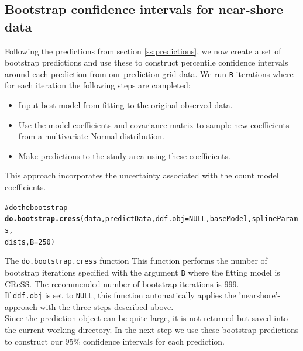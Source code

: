 \documentclass[11pt, a4paper]{article}
\makeatletter
\newcommand{\hlfunctioncall}[1]{\textcolor[rgb]{0.501960784313725,0,0.329411764705882}{\textbf{#1}}}%
\newcommand{\hlcomment}[1]{\textcolor[rgb]{0.180392156862745,0.6,0.341176470588235}{#1}}%
\newenvironment{kframe}{%
 \def\at@end@of@kframe{}%
 \ifinner\ifhmode%
  \def\at@end@of@kframe{\end{minipage}}%
  \begin{minipage}{\columnwidth}%
 \fi\fi%
 \def\FrameCommand##1{\hskip\@totalleftmargin \hskip-\fboxsep
 \colorbox{shadecolor}{##1}\hskip-\fboxsep
     \hskip-\linewidth \hskip-\@totalleftmargin \hskip\columnwidth}%
 \MakeFramed {\advance\hsize-\width
   \@totalleftmargin\z@ \linewidth\hsize
   \@setminipage}}%
 {\par\unskip\endMakeFramed%
 \at@end@of@kframe}
\newenvironment{knitrout}{}{} %
\makeatother
\begin{document}
\subsection{Bootstrap confidence intervals for near-shore data}
\noindent Following the predictions from section \ref{ss:predictions}, we now create a set of bootstrap predictions and use these to construct percentile confidence intervals around each prediction from our prediction grid data. We run {\tt B} iterations where for each iteration the following steps are completed: 
\begin{itemize}
\item Input best model from fitting to the original observed data.
\item{Use the model coefficients and covariance matrix to sample new coefficients from a multivariate Normal distribution.}
\item{Make predictions to the study area using these coefficients.}
\end{itemize}
This approach incorporates the uncertainty associated with the count model coefficients. 

\begin{knitrout}\footnotesize
{}\color{fgcolor}\begin{kframe}
\begin{alltt}
\hlcomment{# do the bootstrap}
\hlfunctioncall{do.bootstrap.cress}(data, predictData, ddf.obj=NULL, baseModel, splineParams, 
                dists, B=250)
\end{alltt}
\end{kframe}
\end{knitrout}
\begin{block}{The {\tt do.bootstrap.cress} function}
This function performs the number of bootstrap iterations specified with the argument {\tt B} where the fitting model is CReSS. The recommended number of bootstrap iterations is 999. \\
If {\tt ddf.obj} is set to {\tt NULL}, this function automatically applies the 'nearshore'-approach with the three steps described above.\\
Since the prediction object can be quite large, it is not returned but saved into the current working directory. In the next step we use these bootstrap predictions to construct our 95\% confidence intervals for each prediction. 
\end{block}
\end{document}
